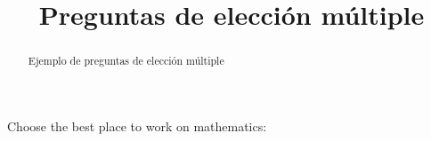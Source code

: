 \documentclass{ximera}
\title{Preguntas de elecci\'on m\'ultiple}
\begin{document}
  

\begin{abstract}  
	Ejemplo de preguntas de elecci\'on m\'ultiple
\end{abstract}  

\maketitle  

\begin{exercise}  
  Choose the best place to work on mathematics:
  \begin{multipleChoice}  
  \end{multipleChoice}  
\end{exercise}  
\end{document}
